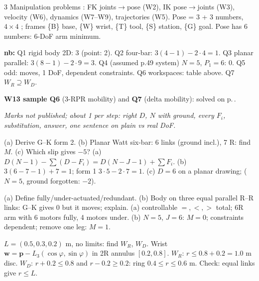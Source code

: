 \begin{multicols}{3}
Manipulation problems : FK joints$\to$pose (W2), IK pose$\to$joints (W3), velocity (W6), dynamics (W7--W9), trajectories (W5). Pose = 3 + 3 numbers, $4\times4$ ; frames \{B\} base, \{W\} wrist, \{T\} tool, \{S\} station, \{G\} goal. Pose has 6 numbers: 6-DoF arm minimum.\par
\textbf{nb:} Q1 rigid body 2D: 3 (point: 2). Q2 four-bar: $3(4-1)-2\cdot4=1$. Q3 planar parallel: $3(8-1)-2\cdot9=3$. Q4 (assumed p.49 system) $N=5$, $P_1=6$: 0. Q5 odd: moves, 1 DoF, dependent constraints. Q6 workspaces: table above. Q7 $W_R\supseteq W_D$.\par
\textbf{W13 sample Q6} (3-RPR mobility) and \textbf{Q7} (delta mobility): solved on p.\,\pageref{p:SAMPLE}.

\textit{Marks not published; about 1 per step: right $D$, $N$ with ground, every $F_i$, substitution, answer, one sentence on plain vs real DoF.}
\begin{examq}
(a) Derive G--K form 2. (b) Planar Watt six-bar: 6 links (ground incl.), 7 R: find $M$. (c) Which slip gives $-5$?
\solution
(a) $D(N-1)-\sum(D-F_i)=D(N-J-1)+\sum F_i$. (b) $3(6-7-1)+7=\boxed1$; form 1 $3\cdot5-2\cdot7=1$. (c) $D=6$ on a planar drawing; ($N=5$, ground forgotten: $-2$). \chk
\end{examq}
\begin{examq}
(a) Define fully/under-actuated/redundant. (b) Body on three equal parallel R--R links: G--K gives 0 but it moves; explain.
\solution
(a) controllable $=,<,>$ total; 6R arm with 6 motors fully, 4 motors under. (b) $N=5$, $J=6$: $M=\boxed0$; constraints dependent; remove one leg: $M=\boxed1$. \chk
\end{examq}
\begin{examq}
$L=(0.5,0.3,0.2)$ m, no limits: find $W_R$, $W_D$.
\solution
Wrist $\mathbf w=\mathbf p-L_3(\cos\varphi,\sin\varphi)$ in 2R annulus $[0.2,0.8]$. $W_R$: $r\le0.8+0.2=\boxed{1.0}$ m disc. $W_D$: $r+0.2\le0.8$ and $r-0.2\ge0.2$: ring $\boxed{0.4\le r\le0.6}$ m. Check: equal links give $r\le L$. \chk
\end{examq}
\end{multicols}
